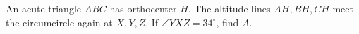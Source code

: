 An acute triangle $ABC$ has orthocenter $H$. The altitude lines $AH,BH,CH$ meet the circumcircle again at $X,Y,Z$. If $\angle YXZ=34^\circ$, find $A$.
